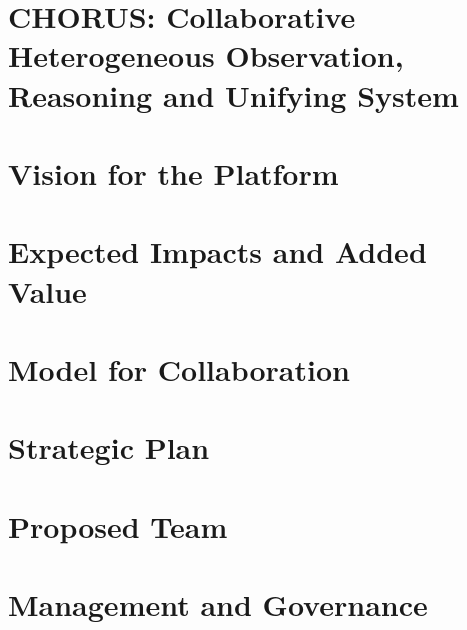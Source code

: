 \documentclass[pdftex,12pt]{article}
\begin{document}
\pagestyle{myheadings}

\section*{CHORUS:  Collaborative Heterogeneous Observation, Reasoning and Unifying System}

\section{Vision for the Platform}



\section{Expected Impacts and Added Value}



\section{Model for Collaboration}



\section{Strategic Plan}



\section{Proposed Team}



\section{ Management and Governance }


\end{document}
